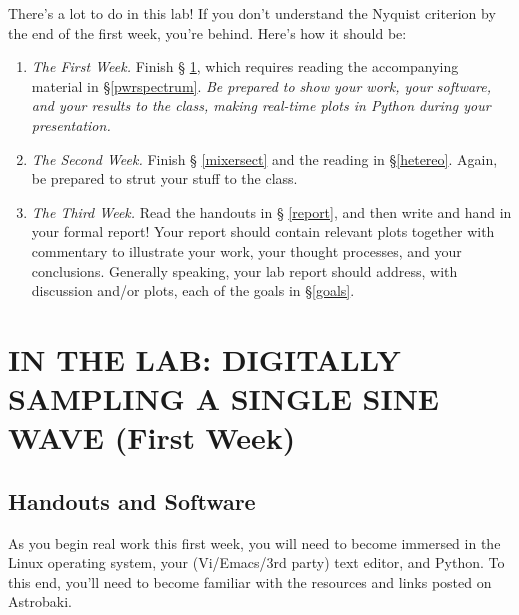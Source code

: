 \documentclass[12pt,preprint]{aastex}
\begin{document}
There's a lot to do in this lab! If you don't understand the Nyquist criterion
by the end of the first week, you're behind. Here's how it should be:
\begin{enumerate}

\item {\it The First Week.} Finish \S
  \ref{nyquist}, which requires reading the accompanying
  material in \S \ref{pwrspectrum}. {\it Be prepared to show your work, your
  software, and your results to the class, making real-time plots in
  Python during your presentation.}

\item {\it The Second Week.} Finish \S
  \ref{mixersect} and the reading in \S \ref{hetereo}. Again, be prepared
  to strut your stuff to the class.

\item {\it The Third Week.} Read the handouts in \S
  \ref{report}, and then write and hand in your formal report!  Your
  report should contain relevant plots together with commentary to
  illustrate your work, your thought processes, and your conclusions.
  Generally speaking, your lab report should address, with discussion
  and/or plots, each of the goals in \S \ref{goals}.

\end{enumerate}

\section{IN THE LAB: DIGITALLY SAMPLING A SINGLE SINE WAVE (First
  Week)}
\label{nyquist}
%
\subsection{Handouts and Software}

As you begin real work this first week, you will need to become immersed
in the Linux operating system, your (Vi/Emacs/3rd party) text editor, and Python. To this end,
you'll need to become familiar with the resources and links posted on Astrobaki.
\end{document}
